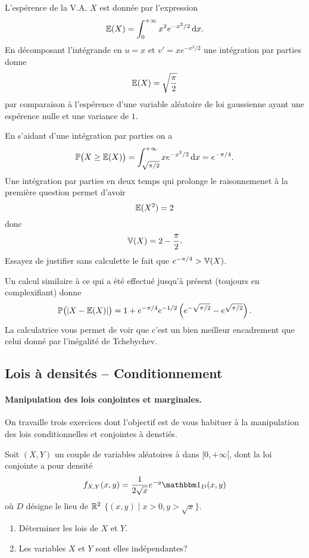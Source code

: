 \documentclass[11pt, a4paper]{article}
\begin{document}
\begin{solution}
  L'espérence de la V.A. $X$ est donnée par l'expression
  \[
  \mathbb{E}(X) = \int_0^{+\infty} x^2e^{-x^2/2}\operatorname{d\!}{x}.
  \]
  En décomposant l'intégrande en $u = x$ et $v' = xe^{-x^2/2}$ une
  intégration par parties donne
  \[
  \mathbb{E}(X) = \sqrt{\frac{\pi}{2}}
  \]
  par comparaison à l'espérence d'une variable aléatoire de loi
  gaussienne ayant une espérence nulle et une variance de $1$.

  \noindent En s'aidant d'une intégration par parties on a
  \[
  \mathbb{P}\big(X \geq \mathbb{E}(X)\big) =
  \int_{\sqrt{\pi/2}}^{+\infty}xe^{-x^2/2}\operatorname{d\!}{x} = e^{-\pi/4}.
  \]
  Une intégration par parties en deux temps qui prolonge le
  raisonnemenet à la première question permet d'avoir
  \[
  \mathbb{E}(X^2) = 2
  \]
  donc
  \[
  \mathbb{V}(X) = 2 - \frac{\pi}{2}.
  \]
  Essayez de justifier sans calculette le fait que
  $e^{-\pi/4} > \mathbb{V}(X)$.

  \noindent Un calcul similaire à ce qui a été effectué jusqu'à
  présent (toujours en complexifiant) donne
  \[
  \mathbb{P}\big(|X- \mathbb{E}(X)|\big) = 1 +
  e^{-\pi/4}e^{-1/2}\left(e^{-\sqrt{\pi/2}} - e^{\sqrt{\pi/2}}\right).
  \]
  La calculatrice vous permet de voir que c'est un bien meilleur
  encadrement que celui donné par l'inégalité de Tchebychev.
\end{solution}


\subsection{Lois à densités -- Conditionnement}

\paragraph{Manipulation des lois conjointes et marginales.} On
travaille trois exercices dont l'objectif est de vous habituer à la
manipulation des lois conditionnelles et conjointes à denstiés.

\begin{question}
  Soit $(X, Y)$ un couple de variables aléatoires à dans
  $[0, +\infty[$, dont la loi conjointe a pour densité
  \[ f_{X, Y}(x, y) = \frac{1}{2\sqrt{x}}e^{-y}\bOne_D(x, y)
  \]
  où $D$ désigne le lieu de $\mathbb{R}^2$
  $\{(x, y) \mid x > 0, y > \sqrt{x}\}$.
  \begin{enumerate}
  \item Déterminer les lois de $X$ et $Y$.
  \item Les variables $X$ et $Y$ sont elles indépendantes?
  \end{enumerate}
\end{question}
\end{document}
